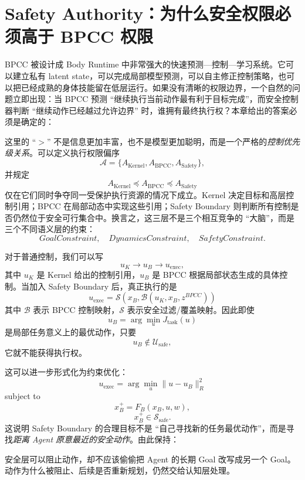 \section{Safety Authority：为什么安全权限必须高于 BPCC 权限}

BPCC 被设计成 Body Runtime 中非常强大的快速预测—控制—学习系统。它可以建立私有 latent state，可以完成局部模型预测，可以自主修正控制策略，也可以把已经成熟的身体技能留在低层运行。如果没有清晰的权限边界，一个自然的问题立即出现：当 BPCC 预测 ``继续执行当前动作最有利于目标完成''，而安全控制器判断 ``继续动作已经越过允许边界'' 时，谁拥有最终执行权？本章给出的答案必须是确定的：
\begin{statementbox}
\centering
{}
\end{statementbox}

这里的 ``$>$'' 不是信息更加丰富，也不是模型更加聪明，而是一个严格的\emph{控制优先级关系}。可以定义执行权限偏序
\[
\mathcal A
=
\{
A_{\mathrm{Kernel}},
A_{\mathrm{BPCC}},
A_{\mathrm{Safety}}
\},
\]
并规定
\[
A_{\mathrm{Kernel}}
\preceq
A_{\mathrm{BPCC}}
\preceq
A_{\mathrm{Safety}}
\]
仅在它们同时争夺同一受保护执行资源的情况下成立。Kernel 决定目标和高层控制引用；BPCC 在局部动态中实现这些引用；Safety Boundary 则判断所有控制是否仍然位于安全可行集合中。换言之，这三层不是三个相互竞争的 ``大脑''，而是三个不同语义层的约束：
\[
GoalConstraint,
\quad
DynamicsConstraint,
\quad
SafetyConstraint.
\]

对于普通控制，我们可以写
\[
u_K
\rightarrow
u_B
\rightarrow
u_{\mathrm{exec}},
\]
其中 $u_K$ 是 Kernel 给出的控制引用，$u_B$ 是 BPCC 根据局部状态生成的具体控制。当加入 Safety Boundary 后，真正执行的是
\[
\boxed{
u_{\mathrm{exec}}
=
\mathcal S
\left(
x_B,
\mathcal B
(
u_K,x_B,z^{BPCC}
)
\right)
}
\]
其中 $\mathcal B$ 表示 BPCC 控制映射，$\mathcal S$ 表示安全过滤/覆盖映射。因此即使
\[
u_B
=
\arg\min_u
J_{\mathrm{task}}(u)
\]
是局部任务意义上的最优动作，只要
\[
u_B\notin
\mathcal U_{\mathrm{safe}},
\]
它就不能获得执行权。

这可以进一步形式化为约束优化：
\[
u_{\mathrm{exec}}
=
\arg\min_u
\|u-u_B\|_R^2
\]
subject to
\[
x_B^{+}
=
F_B(x_B,u,w),
\]
\[
x_B^{+}
\in
\mathcal S_{\mathrm{safe}}.
\]
这说明 Safety Boundary 的合理目标不是 ``自己寻找新的任务最优动作''，而是寻找\emph{距离 Agent 原意最近的安全动作}。由此保持：
\begin{statementbox}
\centering
{}
\end{statementbox}
安全层可以阻止动作，却不应该偷偷把 Agent 的长期 Goal 改写成另一个 Goal。动作为什么被阻止、后续是否重新规划，仍然交给认知层处理。

